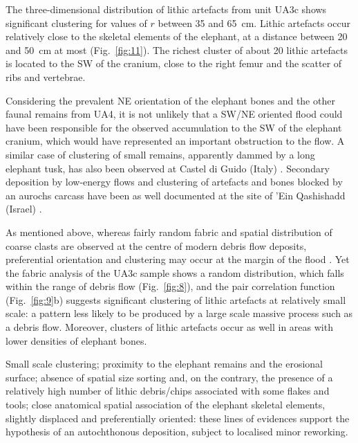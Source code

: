 \documentclass[preprint,authoryear,times]{elsarticle} %
\begin{document}

The three-dimensional distribution of lithic artefacts from unit UA3c shows significant clustering for values of $r$ between 35 and 65~cm. Lithic artefacts occur relatively close to the skeletal elements of the elephant, at a distance between 20 and 50~cm at most (Fig.~\ref{fig:11}). The richest cluster of about 20 lithic artefacts is located to the SW of the cranium, close to the right femur and the scatter of ribs and vertebrae.

Considering the prevalent NE orientation of the elephant bones and the other faunal remains from UA4, it is not unlikely that a SW/NE oriented flood could have been responsible for the observed accumulation to the SW of the elephant cranium, which would have represented an important obstruction to the flow. A similar case of clustering of small remains, apparently dammed by a long elephant tusk, has also been observed at Castel di Guido (Italy) \citep{Boschian2010}. Secondary deposition by low-energy flows and clustering of artefacts and bones blocked by an aurochs carcass have been as well documented at the site of 'Ein Qashishadd (Israel) \citep{Hovers2014}.

As mentioned above, whereas fairly random fabric and spatial distribution of coarse clasts are observed at the centre of modern debris flow deposits, preferential orientation and clustering may occur at the margin of the flood \citep{Pierson2005}. Yet the fabric analysis of the UA3c sample shows a random distribution, which falls within the range of debris flow (Fig.~\ref{fig:8}), and the pair correlation function (Fig.~\ref{fig:9}b) suggests significant clustering of lithic artefacts at relatively small scale: a pattern less likely to be produced by a large scale massive process such as a debris flow. Moreover, clusters of lithic artefacts occur as well in areas with lower densities of elephant bones.

Small scale clustering; proximity to the elephant remains and the erosional surface; absence of spatial size sorting and, on the contrary, the presence of a relatively high number of lithic debris/chips associated with some flakes and tools; close anatomical spatial association of the elephant skeletal elements, slightly displaced and preferentially oriented: these lines of evidences support the hypothesis of an autochthonous deposition, subject to localised minor reworking.
\end{document}
